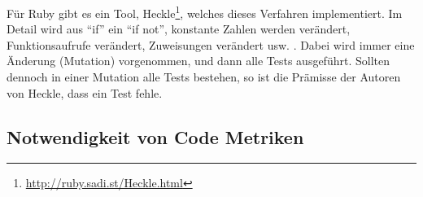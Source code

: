  Für Ruby gibt es ein Tool, Heckle\footnote{\url{http://ruby.sadi.st/Heckle.html}}, welches dieses Verfahren implementiert. Im Detail wird aus "`if"' ein "`if not"', konstante Zahlen werden verändert, Funktionsaufrufe verändert, Zuweisungen verändert usw. \citep{ruby_sadists_confessions_2010}. Dabei wird immer eine Änderung (Mutation) vorgenommen, und dann alle Tests ausgeführt. Sollten dennoch in einer Mutation alle Tests bestehen, so ist die Prämisse der Autoren von Heckle, dass ein Test fehle.
 
 \subsection{Notwendigkeit von Code Metriken}